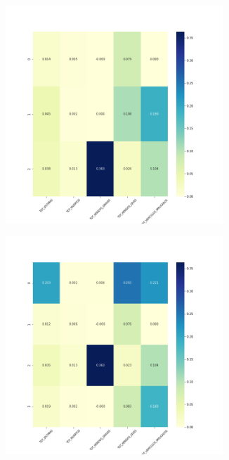 \begin{figure}[H]
\begin{subfigure}{.5\textwidth}
  \centering
  \includegraphics[width=0.9\textwidth]{imagenes/case2/kmeans/heatmaps/hm_kmeans_case2_entrada_k3.png}
\end{subfigure}%
\begin{subfigure}{.5\textwidth}
  \centering
  \includegraphics[width=0.9\textwidth]{imagenes/case2/kmeans/heatmaps/hm_kmeans_case2_entrada_k4.png}

\end{subfigure}
\end{figure}
